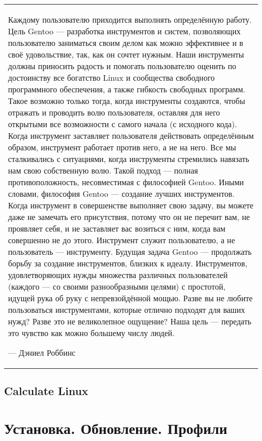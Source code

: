 \documentclass[12pt, a4paper]{article}
\begin{document}
\begin{center}
\begin{tabular}{p{14cm}}
Каждому пользователю приходится выполнять определённую работу. Цель Gentoo — разработка инструментов и систем, позволяющих пользователю заниматься своим делом как можно эффективнее и в своё удовольствие, так, как он сочтет нужным. Наши инструменты должны приносить радость и помогать пользователю оценить по достоинству все богатство Linux и сообщества свободного программного обеспечения, а также гибкость свободных программ. Такое возможно только тогда, когда инструменты создаются, чтобы отражать и проводить волю пользователя, оставляя для него открытыми все возможности с самого начала (с исходного кода). Когда инструмент заставляет пользователя действовать определённым образом, инструмент работает против него, а не на него. Все мы сталкивались с ситуациями, когда инструменты стремились навязать нам свою собственную волю. Такой подход — полная противоположность, несовместимая с философией Gentoo.
Иными словами, философия Gentoo — создание лучших инструментов. Когда инструмент в совершенстве выполняет свою задачу, вы можете даже не замечать его присутствия, потому что он не перечит вам, не проявляет себя, и не заставляет вас возиться с ним, когда вам совершенно не до этого. Инструмент служит пользователю, а не пользователь — инструменту.
Будущая задача Gentoo — продолжать борьбу за создание инструментов, близких к идеалу. Инструментов, удовлетворяющих нужды множества различных пользователей (каждого — со своими разнообразными целями) с простотой, идущей рука об руку с непревзойдённой мощью. Разве вы не любите пользоваться инструментами, которые отлично подходят для ваших нужд? Разве это не великолепное ощущение? Наша цель — передать это чувство как можно большему числу людей.
\newline
\begin{flushright}
— Дэниел Роббинс
\end{flushright}

\end{tabular}
\end{center}

\subsection{Calculate Linux}

\newpage

\section{Установка. Обновление. Профили}
\end{document}
